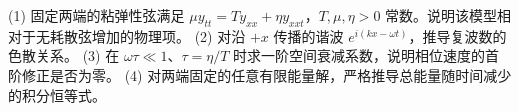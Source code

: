 (1) 固定两端的粘弹性弦满足 \(\mu y_{tt}=Ty_{xx}+\eta y_{xxt}\)，\(T,\mu,\eta>0\) 常数。说明该模型相对于无耗散弦增加的物理项。
(2) 对沿 \(+x\) 传播的谐波 \(e^{i(kx-\omega t)}\)，推导复波数的色散关系。
(3) 在 \(\omega\tau\ll1\)、\(\tau=\eta/T\) 时求一阶空间衰减系数，说明相位速度的首阶修正是否为零。
(4) 对两端固定的任意有限能量解，严格推导总能量随时间减少的积分恒等式。
